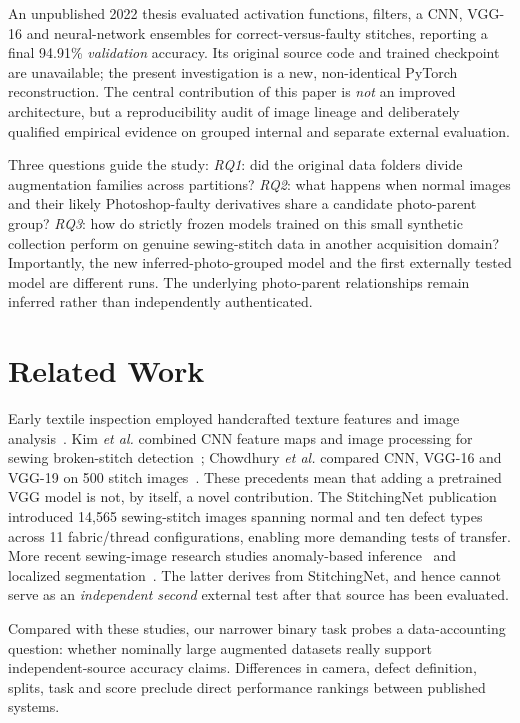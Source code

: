 \documentclass[conference,a4paper]{IEEEtran}
\begin{document}
An unpublished 2022 thesis evaluated activation functions, filters, a CNN, VGG-16 and neural-network ensembles for correct-versus-faulty stitches, reporting a final 94.91\% \emph{validation} accuracy. Its original source code and trained checkpoint are unavailable; the present investigation is a new, non-identical PyTorch reconstruction. The central contribution of this paper is \emph{not} an improved architecture, but a reproducibility audit of image lineage and deliberately qualified empirical evidence on grouped internal and separate external evaluation.

Three questions guide the study: \emph{RQ1}: did the original data folders divide augmentation families across partitions? \emph{RQ2}: what happens when normal images and their likely Photoshop-faulty derivatives share a candidate photo-parent group? \emph{RQ3}: how do strictly frozen models trained on this small synthetic collection perform on genuine sewing-stitch data in another acquisition domain? Importantly, the new inferred-photo-grouped model and the first externally tested model are different runs. The underlying photo-parent relationships remain inferred rather than independently authenticated.

\section{Related Work}
Early textile inspection employed handcrafted texture features and image analysis~\cite{ngan}. Kim \emph{et al.} combined CNN feature maps and image processing for sewing broken-stitch detection~\cite{kim}; Chowdhury \emph{et al.} compared CNN, VGG-16 and VGG-19 on 500 stitch images~\cite{chowdhury}. These precedents mean that adding a pretrained VGG model is not, by itself, a novel contribution. The StitchingNet publication~\cite{stitchingnet} introduced 14,565 sewing-stitch images spanning normal and ten defect types across 11 fabric/thread configurations, enabling more demanding tests of transfer. More recent sewing-image research studies anomaly-based inference~\cite{patchcore2026} and localized segmentation~\cite{stitchingnetseg2026}. The latter derives from StitchingNet, and hence cannot serve as an \emph{independent second} external test after that source has been evaluated.

Compared with these studies, our narrower binary task probes a data-accounting question: whether nominally large augmented datasets really support independent-source accuracy claims. Differences in camera, defect definition, splits, task and score preclude direct performance rankings between published systems.
\end{document}
